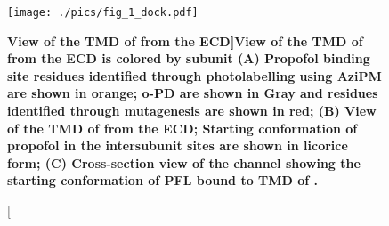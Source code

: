\documentclass{biophys}
\begin{document}
\begin{figure}
\begin{center}
\centering
\texttt{[image: ./pics/fig\_1\_dock.pdf]}
\caption[\bf View of the TMD of \GABAA  from the ECD]{{\bf View of the TMD of \GABAA  from the ECD} \GABAA  is colored by subunit (A) Propofol binding site residues identified through photolabelling using AziPM are shown in orange; o-PD are shown in Gray and residues identified through mutagenesis are shown in red; (B) View of the TMD of \GABAA  from the ECD; Starting conformation of propofol in the intersubunit sites are shown in licorice form; (C) Cross-section view of the channel showing the starting conformation of PFL bound to TMD of \GABAA.}
\label{fig:dockPic}
\end{center}
\end{figure}
\end{document}
